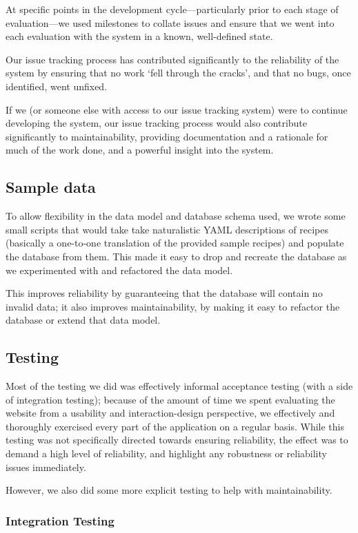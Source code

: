 At specific points in the development cycle---particularly prior to
each stage of evaluation---we used milestones to collate issues and
ensure that we went into each evaluation with the system in a known,
well-defined state.

Our issue tracking process has contributed significantly to the
reliability of the system by ensuring that no work `fell through the
cracks', and that no bugs, once identified, went unfixed.

If we (or someone else with access to our issue tracking system) were
to continue developing the system, our issue tracking process would
also contribute significantly to maintainability, providing
documentation and a rationale for much of the work done, and a
powerful insight into the system.

\subsection{Sample data}

To allow flexibility in the data model and database schema used, we
wrote some small scripts that would take take naturalistic YAML
descriptions of recipes (basically a one-to-one translation of the
provided sample recipes) and populate the database from them. This
made it easy to drop and recreate the database as we experimented with
and refactored the data model.

This improves reliability by guaranteeing that the database will
contain no invalid data; it also improves maintainability, by making
it easy to refactor the database or extend that data model.

\subsection{Testing}

Most of the testing we did was effectively informal acceptance testing
(with a side of integration testing); because of the amount of time we
spent evaluating the website from a usability and interaction-design
perspective, we effectively and thoroughly exercised every part of the
application on a regular basis. While this testing was not
specifically directed towards ensuring reliability, the effect was to
demand a high level of reliability, and highlight any robustness or
reliability issues immediately.

However, we also did some more explicit testing to help with
maintainability.

\subsubsection{Integration Testing}

